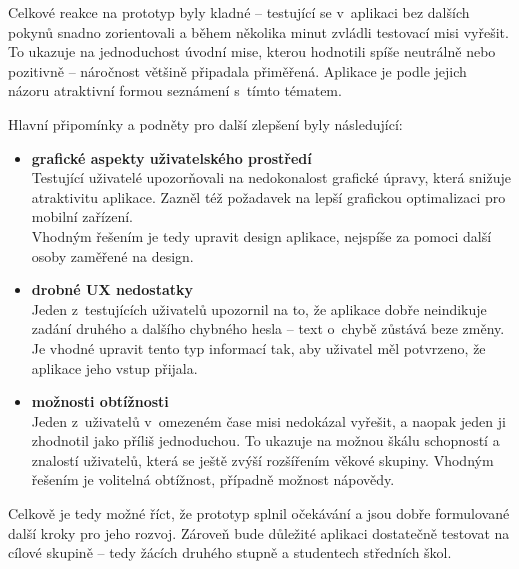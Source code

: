 Celkové reakce na prototyp byly kladné -- testující se v~aplikaci bez dalších pokynů snadno zorientovali a během několika minut zvládli testovací misi vyřešit. To ukazuje na jednoduchost úvodní mise, kterou hodnotili spíše neutrálně nebo pozitivně -- náročnost většině připadala přiměřená.
Aplikace je podle jejich názoru atraktivní formou seznámení s~tímto tématem.

Hlavní připomínky a podněty pro další zlepšení byly následující:

\begin{itemize}
	\item \textbf{grafické aspekty uživatelského prostředí}\\
	Testující uživatelé upozorňovali na nedokonalost grafické úpravy, která snižuje atraktivitu aplikace.
	Zazněl též požadavek na lepší grafickou optimalizaci pro mobilní zařízení.\\  
	Vhodným řešením je tedy upravit design aplikace, nejspíše za pomoci další osoby zaměřené na design.
	\item \textbf{drobné UX nedostatky}\\
	Jeden z~testujících uživatelů upozornil na to, že aplikace dobře neindikuje zadání druhého a dalšího chybného hesla -- text o~chybě zůstává beze změny.\\
	Je vhodné upravit tento typ informací tak, aby uživatel měl potvrzeno, že aplikace jeho vstup přijala.\\
	\item \textbf{možnosti obtížnosti}\\
	Jeden z~uživatelů v~omezeném čase misi nedokázal vyřešit, a naopak jeden ji zhodnotil jako příliš jednoduchou. To ukazuje na možnou škálu schopností a znalostí uživatelů, která se ještě zvýší rozšířením věkové skupiny.
	Vhodným řešením je volitelná obtížnost, případně možnost nápovědy.
\end{itemize}

Celkově je tedy možné říct, že prototyp splnil očekávání a jsou dobře formulované další kroky pro jeho rozvoj.
Zároveň bude důležité aplikaci dostatečně testovat na cílové skupině -- tedy žácích druhého stupně a studentech středních škol.   